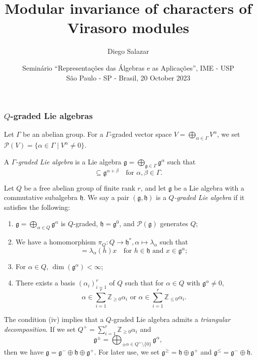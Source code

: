 \documentclass{beamer}
\title[Modular inv.\ of char.\ of Virasoro modules]{Modular invariance of characters of Virasoro modules}
\author[Salazar]{Diego Salazar\inst{1}}
\institute[IMPA]{\inst{1} Instituto de Matemática Pura e Aplicada (IMPA)}
\date[20 October 2023]{Seminário ``Representações das Álgebras e as Aplicações'', IME - USP \\
  São Paulo - SP - Brasil, 20 October 2023}
\begin{document}
\maketitle

\begin{frame}
  \frametitle{$Q$-graded Lie algebras}
  Let $\Gamma$ be an abelian group.
  For a $\Gamma$-graded vector space $V = \bigoplus_{\alpha \in \Gamma}V^{\alpha}$, we set $\mathcal{P}(V) = \{\alpha \in \Gamma \mid V^{\alpha} \neq 0\}$.

  A \emph{$\Gamma$-graded Lie algebra} is a Lie algebra $\mathfrak{g} = \bigoplus_{\mathfrak{g} \in \Gamma}\mathfrak{g}^{\alpha}$ such that
  \begin{equation*}
    [\mathfrak{g}^{\alpha}, \mathfrak{g}^{\beta}] \subseteq \mathfrak{g}^{\alpha + \beta} \quad \text{for $\alpha, \beta \in \Gamma$}.
  \end{equation*}

  Let $Q$ be a free abelian group of finite rank $r$, and let $\mathfrak{g}$ be a Lie algebra with a commutative subalgebra $\mathfrak{h}$.
  We say a pair $(\mathfrak{g}, \mathfrak{h})$ is a \emph{$Q$-graded Lie algebra} if it satisfies the following:
  \begin{enumerate}
  \item $\mathfrak{g} = \bigoplus_{\alpha \in Q}\mathfrak{g}^{\alpha}$ is $Q$-graded, $\mathfrak{h} = \mathfrak{g}^0$, and $\mathcal{P}(\mathfrak{g})$ generates $Q$;
  \item We have a homomorphism $\pi_Q: Q \to \mathfrak{h}^*, \alpha \mapsto \lambda_{\alpha}$ such  that
    \begin{equation*}
      [h, x] = \lambda_{\alpha}(h)x \quad \text{for $h \in \mathfrak{h}$ and $x \in \mathfrak{g}^{\alpha}$};
    \end{equation*}
  \item For $\alpha \in Q$, $\dim(\mathfrak{g}^{\alpha}) < \infty$;
  \item There exists a basis $(\alpha_i)_{i = 1}^r$ of $Q$ such that for $\alpha \in Q$ with $\mathfrak{g}^{\alpha} \neq 0$,
    \begin{equation*}
      \text{$\alpha \in \sum_{i = 1}^r\mathbb{Z}_{\ge 0}\alpha_i$ or $\alpha \in \sum_{i = 1}^r\mathbb{Z}_{\le 0}\alpha_i$}.
    \end{equation*}
  \end{enumerate}
\end{frame}

\begin{frame}
  The condition (iv) implies that a $Q$-graded Lie algebra admits a \emph{triangular decomposition}.
  If we set $Q^+ = \sum_{i = 1}^r\mathbb{Z}_{\ge 0}\alpha_i$ and
  \begin{equation*}
    \mathfrak{g}^{\pm} = \bigoplus_{\pm \alpha \in Q^+ \setminus \{0\}}\mathfrak{g}^{\alpha},
  \end{equation*}
  then we have $\mathfrak{g} = \mathfrak{g}^- \oplus \mathfrak{h} \oplus \mathfrak{g}^+$.
  For later use, we set $\mathfrak{g}^{\ge} = \mathfrak{h} \oplus \mathfrak{g}^+$ and $\mathfrak{g}^{\le} = \mathfrak{g}^- \oplus \mathfrak{h}$.
\end{frame}
\end{document}
